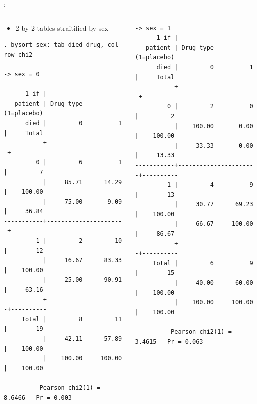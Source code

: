 \begin{frame}[fragile]{\secname: \subsecname}

\begin{columns}
\begin{column}{.5\textwidth}
\begin{itemize}
\item 2 by 2 tables straitified by sex
\end{itemize}
\tiny
\begin{verbatim}
. bysort sex: tab died drug, col row chi2

-> sex = 0

      1 if |
   patient | Drug type (1=placebo)
      died |         0          1 |     Total
-----------+----------------------+----------
         0 |         6          1 |         7 
           |     85.71      14.29 |    100.00 
           |     75.00       9.09 |     36.84 
-----------+----------------------+----------
         1 |         2         10 |        12 
           |     16.67      83.33 |    100.00 
           |     25.00      90.91 |     63.16 
-----------+----------------------+----------
     Total |         8         11 |        19 
           |     42.11      57.89 |    100.00 
           |    100.00     100.00 |    100.00 

          Pearson chi2(1) =   8.6466   Pr = 0.003
\end{verbatim}
\end{column}

\begin{column}{.5\textwidth}
\tiny
\begin{verbatim}
-> sex = 1
      1 if |
   patient | Drug type (1=placebo)
      died |         0          1 |     Total
-----------+----------------------+----------
         0 |         2          0 |         2 
           |    100.00       0.00 |    100.00 
           |     33.33       0.00 |     13.33 
-----------+----------------------+----------
         1 |         4          9 |        13 
           |     30.77      69.23 |    100.00 
           |     66.67     100.00 |     86.67 
-----------+----------------------+----------
     Total |         6          9 |        15 
           |     40.00      60.00 |    100.00 
           |    100.00     100.00 |    100.00 

          Pearson chi2(1) =   3.4615   Pr = 0.063
\end{verbatim}
\end{column}
\end{columns}
\end{frame}

